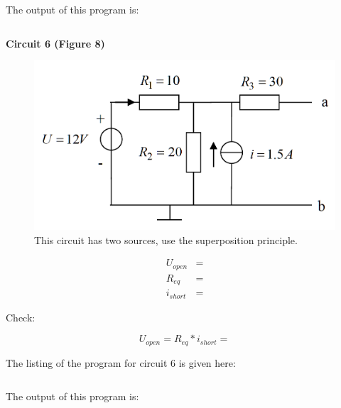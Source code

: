 \documentclass[11pt,letterpaper]{article}
\begin{document}
The output of this program is:

\begin{lstlisting}
\end{lstlisting}

\newpage
\textbf{Circuit 6 (Figure 8)}
\begin{figure}
\centering
\includegraphics[width=0.65\linewidth]{HW_Thevenin6}
\caption{This circuit has two sources, use the superposition principle.}
\label{fig:HW_Thevenin6}
\end{figure}

\begin{align}\label{Eqn:HW_Thevenin8}
U_{open} &=  \\
R_{eq}  &=  \\
i_{short} &=
\end{align}

Check:

\begin{equation}
U_{open} = R_{eq} * i_{short} =
\end{equation}

\newpage
The listing of the program for circuit 6 is given here:

\begin{lstlisting}
\end{lstlisting}

The output of this program is:

\begin{lstlisting}
\end{lstlisting}
\end{document}
